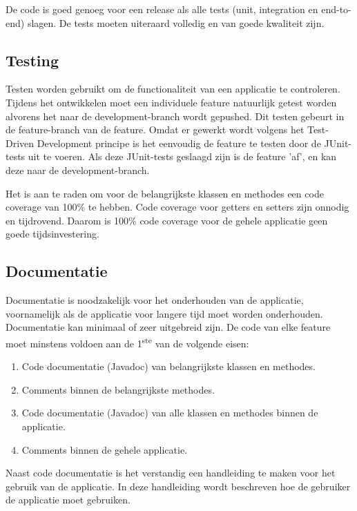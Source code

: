 \documentclass[12pt]{article}
\begin{document}
De code is goed genoeg voor een release als alle tests (unit, integration en end-to-end) slagen. De tests moeten uiteraard volledig en van goede kwaliteit zijn.

\subsection{Testing}
Testen worden gebruikt om de functionaliteit van een applicatie te controleren. Tijdens het ontwikkelen moet een individuele feature natuurlijk getest worden alvorens het naar de development-branch wordt gepushed. Dit testen gebeurt in de feature-branch van de feature. Omdat er gewerkt wordt volgens het Test-Driven Development principe is het eenvoudig de feature te testen door de JUnit-tests uit te voeren. Als deze JUnit-tests geslaagd zijn is de feature 'af', en kan deze naar de development-branch.

Het is aan te raden om voor de belangrijkste klassen en methodes een code coverage van 100\% te hebben. Code coverage voor getters en setters zijn onnodig en tijdrovend. Daarom is 100\% code coverage voor de gehele applicatie geen goede tijdsinvestering.

\subsection{Documentatie}
Documentatie is noodzakelijk voor het onderhouden van de applicatie, voornamelijk als de applicatie voor langere tijd moet worden onderhouden. Documentatie kan minimaal of zeer uitgebreid zijn. De code van elke feature moet minstens voldoen aan de 1\textsuperscript{ste} van de volgende eisen:

\begin{enumerate}
	\item Code documentatie (Javadoc) van belangrijkste klassen en methodes.
	\item Comments binnen de belangrijkste methodes.
	\item Code documentatie (Javadoc) van alle klassen en methodes binnen de applicatie.
	\item Comments binnen de gehele applicatie.
\end{enumerate}

\noindent Naast code documentatie is het verstandig een handleiding te maken voor het gebruik van de applicatie. In deze handleiding wordt beschreven hoe de gebruiker de applicatie moet gebruiken.
\end{document}

